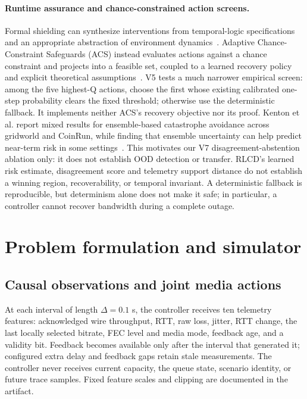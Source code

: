 \documentclass[10pt]{article}
\begin{document}
\paragraph{Runtime assurance and chance-constrained action screens.}
Formal shielding can synthesize interventions from temporal-logic specifications and an appropriate abstraction of environment dynamics~\cite{alshiekh2017shielding}. Adaptive Chance-Constraint Safeguards (ACS) instead evaluates actions against a chance constraint and projects into a feasible set, coupled to a learned recovery policy and explicit theoretical assumptions~\cite{chen2023acs}. V5 tests a much narrower empirical screen: among the five highest-Q actions, choose the first whose existing calibrated one-step probability clears the fixed threshold; otherwise use the deterministic fallback. It implements neither ACS's recovery objective nor its proof. Kenton et al. report mixed results for ensemble-based catastrophe avoidance across gridworld and CoinRun, while finding that ensemble uncertainty can help predict near-term risk in some settings~\cite{kenton2019generalizing}. This motivates our V7 disagreement-abstention ablation only: it does not establish OOD detection or transfer. RLCD's learned risk estimate, disagreement score and telemetry support distance do not establish a winning region, recoverability, or temporal invariant. A deterministic fallback is reproducible, but determinism alone does not make it safe; in particular, a controller cannot recover bandwidth during a complete outage.

\section{Problem formulation and simulator}
\subsection{Causal observations and joint media actions}
At each interval of length $\Delta=0.1$ s, the controller receives ten telemetry features: acknowledged wire throughput, RTT, raw loss, jitter, RTT change, the last locally selected bitrate, FEC level and media mode, feedback age, and a validity bit. Feedback becomes available only after the interval that generated it; configured extra delay and feedback gaps retain stale measurements. The controller never receives current capacity, the queue state, scenario identity, or future trace samples. Fixed feature scales and clipping are documented in the artifact.
\end{document}
